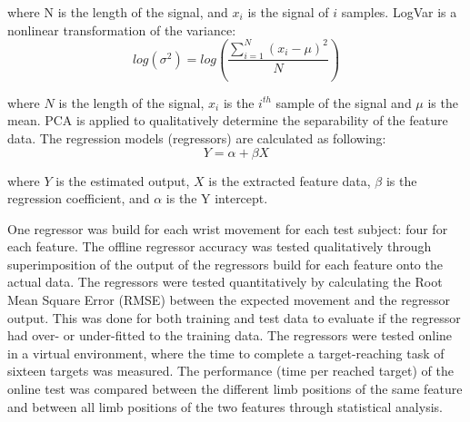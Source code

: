 \documentclass[landscape,a0paper,fontscale=0.375]{baposter} %
\begin{document}
\begin{poster}
{where N is the length of the signal, and $x_i$ is the signal of $i$ samples.
LogVar is a nonlinear transformation of the variance: %
\vspace{-0.2cm}
\begin{equation} \label{eq:logvar}
log(\sigma^2) = log(\frac{\sum\limits_{i=1}^N(x_i - \mu)^2}{N})
\end{equation}\vspace{-0.3cm}

where $N$ is the length of the signal, $x_i$ is the $i^{th}$ sample of the signal and $\mu$ is the mean.
PCA is applied to qualitatively determine the separability of the feature data. %
The regression models (regressors) are calculated as following:
\vspace{-0.1cm}
\begin{equation} \label{eq:simpleLinearRegression}
Y = \alpha + \beta X
\end{equation} \vspace{-0.4cm}

where $Y$ is the estimated output, $X$ is the extracted feature data, $\beta$ is the regression coefficient, and $\alpha$ is the Y intercept.

One regressor was build for each wrist movement for each test subject: four for each feature. The offline regressor accuracy was tested qualitatively through superimposition of the output of the regressors build for each feature onto the actual data. The regressors were tested quantitatively by calculating the Root Mean Square Error (RMSE) between the expected movement and the regressor output. This was done for both training and test data to evaluate if the regressor had over- or under-fitted to the training data. 
The regressors were tested online in a virtual environment, where the time to complete a target-reaching task of sixteen targets was measured. The performance (time per reached target) of the online test was compared between the different limb positions of the same feature and between all limb positions of the two features through statistical analysis.
\vspace{0.5cm}
}



\end{poster}
\end{document}
